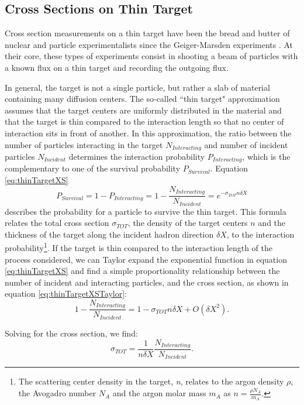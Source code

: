 \subsection{Cross Sections on Thin Target}
Cross section measurements on a thin target have been the bread and butter of nuclear and particle experimentalists since the Geiger-Marsden experiments \cite{Geiger1909}. At their core, these types of experiments consist in shooting a beam of particles with a known flux on a thin target and recording the outgoing flux. 


In general, the target is not a single particle, but rather a slab of material containing many diffusion centers. The so-called  ``thin target" approximation assumes that the target centers are uniformly distributed in the material and that the target is thin compared to the interaction length so that no center of interaction sits in front of another. In this approximation, the ratio between the number of particles interacting in the target $N_{Interacting}$ and number of incident particles $N_{Incident}$ determines the interaction probability $P_{Interacting}$, which is the complementary to one of the survival probability $P_{Survival}$. 
Equation \ref{eq:thinTargetXS} 
\begin{equation}
P_{Survival} = 1- P_{Interacting} = 1 - \frac{N_{Interacting}}{N_{Incident}} = e^{-\sigma_{TOT} n \delta X}
\label{eq:thinTargetXS}
\end{equation}
describes the probability for a particle to survive the thin target. This formula relates the total cross section $\sigma_{TOT}$, the density of the target centers  $n$  and  the thickness of the target  along the incident hadron direction $\delta X$, to the interaction probability\footnote{The scattering center density in the target, {\emph{n}},  relates to the argon density $\rho$, the Avogadro number  $ N_{A} $ and the argon molar mass $m_A$ as $n=\frac{\rho N_{A} }{m_A}$.}. If the target is thin compared to the interaction length of the process considered, we can Taylor expand the exponential function in equation \ref{eq:thinTargetXS} and find a simple proportionality relationship between the number of incident and interacting particles, and the cross section, as shown in equation \ref{eq:thinTargetXSTaylor}:
\begin{equation}
1 - \frac{N_{Interacting}}{N_{Incident}} =  1 -\sigma_{TOT} n \delta X + O(\delta X^2).
\label{eq:thinTargetXSTaylor}
\end{equation}

Solving for the cross section, we find:
\begin{equation}
 \sigma_{TOT}  = \frac{1}{n \delta X}\frac{N_{Interacting}}{N_{Incident}}.
\label{eq:thinTargetXSSolved}
\end{equation}

